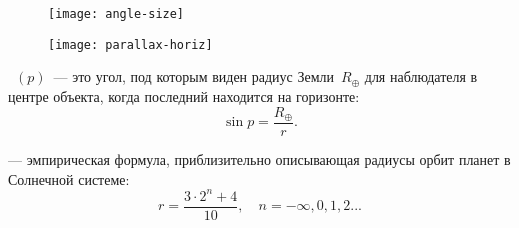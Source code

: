 \vspace{-1.5pc}
\begin{figure}[h!]
	\begin{minipage}[b]{0.5\tw}
		\begin{flushleft}
			\texttt{[image: angle-size]}
		\end{flushleft}
	\end{minipage}
	\begin{minipage}[b]{0.5\tw}
		\centering
		\texttt{[image: parallax-horiz]}
	\end{minipage}
\end{figure}

~$(p)$~--- это угол, под которым виден радиус Земли~$R_\oplus$ для наблюдателя в центре объекта, когда последний находится на горизонте:
\begin{equation}
\sin p=\frac{R_\oplus}{r}.
\end{equation}

 --- эмпирическая формула, приблизительно описывающая 
радиусы орбит планет в Солнечной системе:
\begin{equation}r=\frac{3\cdot 2^n+4}{10}, \quad n=-\infty, 0, 1, 2...
\end{equation}

